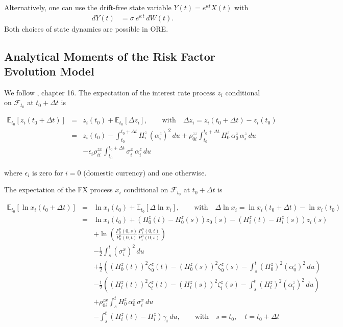 \documentclass[12pt, a4paper]{article}
\begin{document}
{\begin{appendix}
Alternatively, one can use the drift-free state variable $Y(t)=e^{\kappa t} X(t)$ with
\begin{align*}
dY(t) &= \sigma \: e^{\kappa \, t} \, dW(t).
\end{align*}
Both choices of state dynamics are possible in ORE. 

\subsection{Analytical Moments of the Risk Factor Evolution Model}\label{sec:app_analytical_moments}

We follow \cite{Lichters}, chapter 16. The expectation of the interest rate process $z_i$ conditional on $\mathcal{F}_{t_0}$ at $t_0+\Delta t$ is

\begin{eqnarray*}
  \mathbb{E}_{t_0}[z_i(t_0+\Delta t)] &=& z_i(t_0) + \mathbb{E}_{t_0}[\Delta z_i],
  \qquad\mbox{with}\quad \Delta z_i = z_i(t_0+\Delta t) - z_i(t_0) \\
  &=& z_i(t_0) -\int_{t_0}^{t_0+\Delta t} H^z_i\,(\alpha^z_i)^2\,du + \rho^{zz}_{0i} \int_{t_0}^{t_0+\Delta t}
  H^z_0\,\alpha^z_0\,\alpha^z_i\,du \\
  & & - \epsilon_i  \rho^{zx}_{ii}\int_{t_0}^{t_0+\Delta t} \sigma_i^x\,\alpha^z_i\,du
\end{eqnarray*}

where $\epsilon_i$ is zero for $i=0$ (domestic currency) and one otherwise.

\bigskip

The expectation of the FX process $x_i$ conditional on $\mathcal{F}_{t_0}$ at $t_0+\Delta t$ is

\begin{eqnarray*}
  \mathbb{E}_{t_0}[\ln x_i(t_0+\Delta t)] &=& \ln x_i(t_0) +  \mathbb{E}_{t_0}[\Delta \ln x_i],
  \qquad\mbox{with}\quad \Delta \ln x_i = \ln x_i(t_0+\Delta t) - \ln x_i(t_0) \\
  &=& \ln x_i(t_0) + \left(H^z_0(t)-H^z_0(s)\right) z_0(s) -\left(H^z_i(t)-H^z_i(s)\right)z_i(s)\\
  &&+ \ln \left( \frac{P^n_0(0,s)}{P^n_0(0,t)} \frac{P^n_i(0,t)}{P^n_i(0,s)}\right) \\
  && - \frac12 \int_s^t (\sigma^x_i)^2\,du \\
  &&+\frac12 \left((H^z_0(t))^2 \zeta^z_0(t) -  (H^z_0(s))^2 \zeta^z_0(s)- \int_s^t (H^z_0)^2
  (\alpha^z_0)^2\,du\right)\\
  &&-\frac12 \left((H^z_i(t))^2 \zeta^z_i(t) -  (H^z_i(s))^2 \zeta^z_i(s)-\int_s^t (H^z_i)^2 (\alpha^z_i)^2\,du
  \right)\\
  && + \rho^{zx}_{0i} \int_s^t H^z_0\, \alpha^z_0\, \sigma^x_i\,du \\
  &&  - \int_s^t \left(H^z_i(t)-H^z_i\right)\gamma_i \,du, \qquad\mbox{with}\quad s = t_0, \quad t = t_0+\Delta t
\end{eqnarray*}


\end{appendix}}
\end{document}
